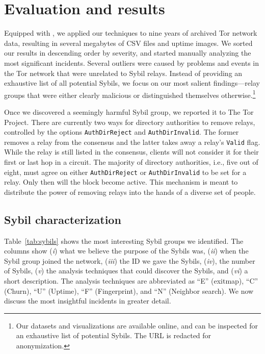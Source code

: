 \section{Evaluation and results}
\label{sec:results}
Equipped with \sys, we applied our techniques to nine years of archived Tor
network data, resulting in several megabytes of CSV files and uptime images.  We
sorted our results in descending order by severity, and started manually
analyzing the most significant incidents.  Several outliers were caused by
problems and events in the Tor network that were unrelated to Sybil relays.
Instead of providing an exhaustive list of all potential Sybils, we focus on our
most salient findings---relay groups that were either clearly malicious or
distinguished themselves otherwise.\footnote{Our datasets and visualizations are
available online, and can be inspected for an exhaustive list of potential
Sybils.  The URL is redacted for anonymization.}

Once we discovered a seemingly harmful Sybil group, we reported it to The Tor
Project.  There are currently two ways for directory authorities to remove
relays, controlled by the options \texttt{AuthDirReject} and
\texttt{AuthDirInvalid}.  The former removes a relay from the consensus and the
latter takes away a relay's \texttt{Valid} flag.  While the relay is still
listed in the consensus, clients will not consider it for their first or last
hop in a circuit.  The majority of directory authorities, i.e., five out of
eight, must agree on either \texttt{AuthDirReject} or \texttt{AuthDirInvalid} to
be set for a relay.  Only then will the block become active.  This mechanism is
meant to distribute the power of removing relays into the hands of a diverse set
of people.

\subsection{Sybil characterization}
\label{sec:sybil_groups}
Table~\ref{tab:sybils} shows the most interesting Sybil groups we identified.
The columns show (\emph{i}) what we believe the purpose of the Sybils was,
(\emph{ii}) when the Sybil group joined the network, (\emph{iii}) the ID we gave
the Sybils, (\emph{iv}), the number of Sybils, (\emph{v}) the analysis
techniques that could discover the Sybils, and (\emph{vi}) a short description.
The analysis techniques are abbreviated as ``E'' (exitmap), ``C'' (Churn), ``U''
(Uptime), ``F'' (Fingerprint), and ``N'' (Neighbor search).  We now discuss the
most insightful incidents in greater detail.

